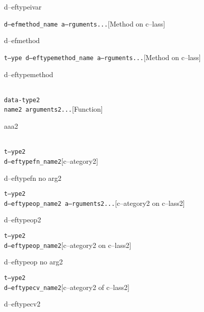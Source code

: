 \documentclass{book}
\begin{document}
\begin{titlepage}
%
d--eftypeivar

\noindent\texttt\bgroup{}d--efmethod\_name a--rguments...\egroup{}\hfill[Method on c--lass]



%
d--efmethod

\noindent\texttt\bgroup{}t--ype d--eftypemethod\_name a--rguments...\egroup{}\hfill[Method on c--lass]



%
d--eftypemethod


\noindent\texttt\bgroup{}\leavevmode{}\\data-type2\leavevmode{}\\name2 arguments2...\egroup{}\hfill[Function]



%
aaa2

\noindent\texttt\bgroup{}\leavevmode{}\\t--ype2\leavevmode{}\\d--eftypefn\_name2\egroup{}\hfill[c--ategory2]



%
d--eftypefn no arg2

\noindent\texttt\bgroup{}t--ype2\leavevmode{}\\d--eftypeop\_name2 a--rguments2...\egroup{}\hfill[c--ategory2 on c--lass2]



%
d--eftypeop2

\noindent\texttt\bgroup{}t--ype2\leavevmode{}\\d--eftypeop\_name2\egroup{}\hfill[c--ategory2 on c--lass2]



%
d--eftypeop no arg2

\noindent\texttt\bgroup{}t--ype2\leavevmode{}\\d--eftypecv\_name2\egroup{}\hfill[c--ategory2 of c--lass2]



%
d--eftypecv2


\end{titlepage}
\end{document}
